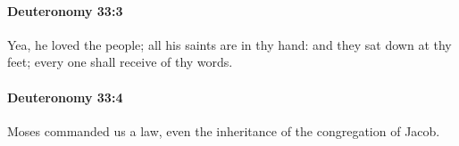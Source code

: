 		\paragraph{Deuteronomy 33:3} %
			\label{DEUTERONOMY-33-3}

			Yea, he loved the people; all his saints are in thy hand: and they sat down at thy feet; every one shall receive of thy words.


		\paragraph{Deuteronomy 33:4} %
			\label{DEUTERONOMY-33-4}

			Moses commanded us a law, even the inheritance of the congregation of Jacob.


